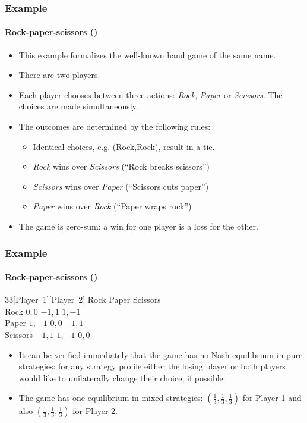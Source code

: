 \documentclass[10pt]{beamer}
\theoremstyle{definition}
\begin{document}
\begin{frame}[fragile]\setcounter{slidenum}{1}
\frametitle{Example }
\framesubtitle{Rock-paper-scissors ()}
\begin{itemize}\itemsep1em
\item This example formalizes the well-known hand game of the same name.
\item There are two players.
\item Each player chooses between three actions: \emph{Rock}, \emph{Paper} or \emph{Scissors}. The choices are made simultaneously.
\item The outcomes are determined by the following rules:
	\begin{itemize}\itemsep1em
	\item Identical choices, e.g. (Rock,Rock), result in a tie.
	\item \emph{Rock} wins over \emph{Scissors} (``Rock breaks scissors'')
	\item \emph{Scissors} wins over \emph{Paper} (``Scissors cuts paper'')
	\item \emph{Paper} wins over \emph{Rock} (``Paper wraps rock'')
	\end{itemize}
\item The game is zero-sum: a win for one player is a loss for the other.
\end{itemize}
\end{frame}


\begin{frame}[fragile]
\frametitle{Example }
\framesubtitle{Rock-paper-scissors ()}
\begin{center}
\begin{game}{3}{3}[Player~1][Player~2]
 \> Rock \> Paper \> Scissors \\
Rock \> $ 0,0 $ \> $ -1,1 $ \> $ 1,-1 $ \\
Paper \> $ 1,-1 $ \> $ 0,0 $ \> $ -1,1 $ \\
Scissors \> $ -1,1 $ \> $ 1,-1 $ \> $ 0,0 $
\end{game}
\end{center}\bigskip

\begin{itemize}\itemsep1em
\item It can be verified immediately that the game has no Nash equilibrium in pure strategies: for any strategy profile either the losing player or both players would like to unilaterally change their choice, if possible.
\item The game has one equilibrium in mixed strategies: $ (\frac{1}{3},\frac{1}{3},\frac{1}{3}) $ for Player 1 and also $ (\frac{1}{3},\frac{1}{3},\frac{1}{3}) $ for Player 2.
\end{itemize}
\end{frame}
\end{document}
